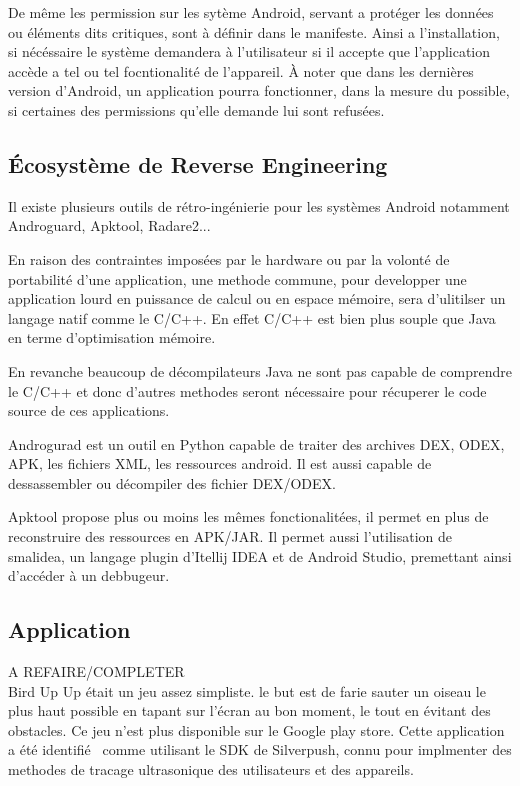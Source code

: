 \documentclass[12pt]{article}
\begin{document}
De même les permission sur les sytème Android, servant a protéger les données ou éléments dits critiques, sont à définir dans le manifeste. Ainsi a l'installation, si nécéssaire le système demandera à l'utilisateur si il accepte que l'application accède a tel ou tel focntionalité de l'appareil. À noter que dans les dernières version d'Android, un application pourra fonctionner, dans la mesure du possible, si certaines des permissions qu'elle demande lui sont refusées.

\subsection{Écosystème de Reverse Engineering}
Il existe plusieurs outils de rétro-ingénierie pour les systèmes Android notamment Androguard, Apktool, Radare2...

En raison des contraintes imposées par le hardware ou par la volonté de portabilité d'une application, une methode commune, pour developper une application lourd en puissance de calcul ou en espace mémoire, sera d'ulitilser un langage natif comme le C/C++. En effet C/C++ est bien plus souple que Java en terme d'optimisation mémoire.

En revanche beaucoup de décompilateurs Java ne sont pas capable de comprendre le C/C++ et donc d'autres methodes seront nécessaire pour récuperer le code source de ces applications.

Androgurad est un outil en Python capable de traiter des archives DEX, ODEX, APK, les fichiers XML, les ressources android. Il est aussi capable de dessassembler ou décompiler des fichier DEX/ODEX.

Apktool propose plus ou moins les mêmes fonctionalitées, il permet en plus de reconstruire des ressources en APK/JAR. Il permet aussi l'utilisation de smalidea, un langage plugin d'Itellij IDEA et de Android Studio, premettant ainsi d'accéder à un debbugeur.


\subsection{Application}

A REFAIRE/COMPLETER\\

\og Bird Up Up \fg{} était un jeu assez simpliste. le but est de farie sauter un oiseau le plus haut possible en tapant sur l'écran au bon moment, le tout en évitant des obstacles. Ce jeu n'est plus disponible sur le Google play store.
Cette application a été identifié~\cite{silverpushunmasked} comme utilisant le SDK de Silverpush, connu pour implmenter des methodes de tracage ultrasonique des utilisateurs et des appareils.
\end{document}
